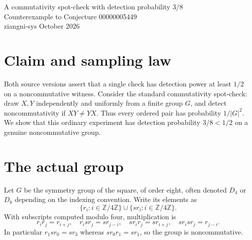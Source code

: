 \documentclass[10pt,a4paper]{article}
\begin{document}
\begin{center}
{\Large A commutativity spot-check with detection probability $3/8$}\\[4pt]
{\large Counterexample to Conjecture 00000005449}\\[6pt]
ziangni-sys  October 2026
\end{center}

\section*{Claim and sampling law}
Both source versions assert that a single check has detection power
at least $1/2$ on a noncommutative witness. Consider the standard
commutativity spot-check: draw $X,Y$ independently and uniformly from
a finite group $G$, and detect noncommutativity if $XY\ne YX$.
Thus every ordered pair has probability $1/|G|^2$. We show that this
ordinary experiment has detection probability $3/8<1/2$ on a
genuine noncommutative group.

\section*{The actual group}
Let $G$ be the symmetry group of the square, of order eight, often
denoted $D_4$ or $D_8$ depending on the indexing convention.
Write its elements as
\[
\{r_i:i\in\mathbb Z/4\mathbb Z\}\cup
\{sr_i:i\in\mathbb Z/4\mathbb Z\}.
\]
With subscripts computed modulo four, multiplication is
\[
r_i r_j=r_{i+j},\quad r_i sr_j=sr_{j-i},\quad
sr_i r_j=sr_{i+j},\quad sr_i sr_j=r_{j-i}.
\]
In particular $r_1 sr_0=sr_3$ whereas $sr_0r_1=sr_1$,
so the group is noncommutative.
\end{document}
